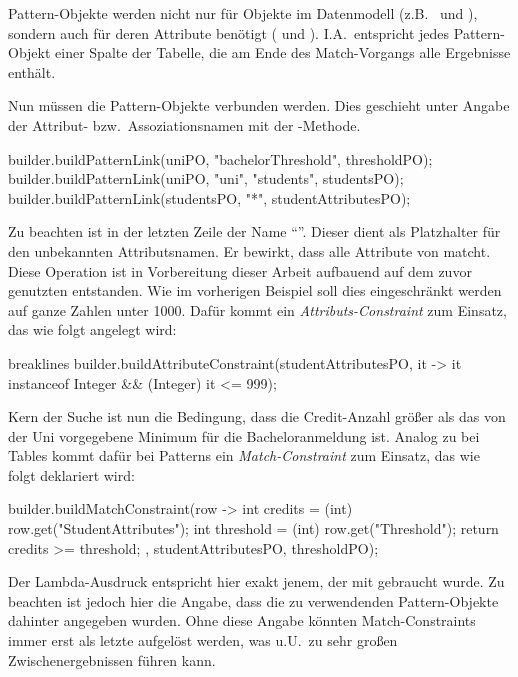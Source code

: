Pattern-Objekte werden nicht nur für Objekte im Datenmodell (z.B.\  und ),
sondern auch für deren Attribute benötigt ( und ).
I.A.\ entspricht jedes Pattern-Objekt einer Spalte der Tabelle, die am Ende des Match-Vorgangs alle Ergebnisse enthält.

Nun müssen die Pattern-Objekte verbunden werden.
Dies geschieht unter Angabe der Attribut- bzw.\ Assoziationsnamen mit der -Methode.

\begin{jcodeblock}
    builder.buildPatternLink(uniPO, "bachelorThreshold", thresholdPO);
    builder.buildPatternLink(uniPO, "uni", "students", studentsPO);
    builder.buildPatternLink(studentsPO, "*", studentAttributesPO);
\end{jcodeblock}

Zu beachten ist in der letzten Zeile der Name ``\code{*}''.
Dieser dient als Platzhalter für den unbekannten Attributsnamen.
Er bewirkt, dass  alle Attribute von  matcht.
Diese Operation ist in Vorbereitung dieser Arbeit aufbauend auf dem zuvor genutzten  entstanden.
Wie im vorherigen Beispiel soll dies eingeschränkt werden auf ganze Zahlen unter 1000.
Dafür kommt ein \emph{Attributs-Constraint} zum Einsatz, das wie folgt angelegt wird:

\begin{jcodeblock*}{breaklines}
    builder.buildAttributeConstraint(studentAttributesPO, it -> it instanceof Integer && (Integer) it <= 999);
\end{jcodeblock*}

Kern der Suche ist nun die Bedingung, dass die Credit-Anzahl größer als das von der Uni vorgegebene Minimum für die Bacheloranmeldung ist.
Analog zu  bei Tables kommt dafür bei Patterns ein \emph{Match-Constraint} zum Einsatz,
das wie folgt deklariert wird:

\begin{jcodeblock}
    builder.buildMatchConstraint(row -> {
        int credits = (int) row.get("StudentAttributes");
        int threshold = (int) row.get("Threshold");
        return credits >= threshold;
    }, studentAttributesPO, thresholdPO);
\end{jcodeblock}

Der Lambda-Ausdruck entspricht hier exakt jenem, der mit  gebraucht wurde.
Zu beachten ist jedoch hier die Angabe, dass die zu verwendenden Pattern-Objekte dahinter angegeben wurden.
Ohne diese Angabe könnten Match-Constraints immer erst als letzte aufgelöst werden,
was u.U.\ zu sehr großen Zwischenergebnissen führen kann.

